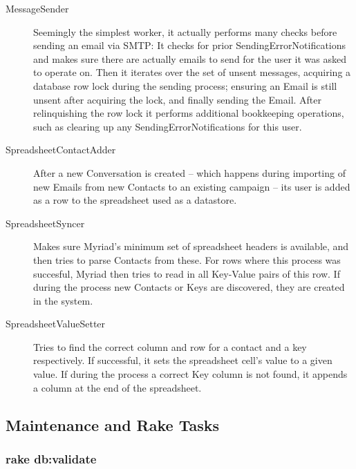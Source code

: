 \begin{description}
\item[MessageSender] Seemingly the simplest worker, it actually performs many checks before sending an email via SMTP: It checks for prior SendingErrorNotifications and makes sure there are actually emails to send for the user it was asked to operate on. Then it iterates over the set of unsent messages, acquiring a database row lock during the sending process; ensuring an Email is still unsent after acquiring the lock, and finally sending the Email. After relinquishing the row lock it performs additional bookkeeping operations, such as clearing up any SendingErrorNotifications for this user.

\item[SpreadsheetContactAdder] After a new Conversation is created -- which happens during importing of new Emails from new Contacts to an existing campaign -- its user is added as a row to the spreadsheet used as a datastore.

\item[SpreadsheetSyncer] Makes sure Myriad's minimum set of spreadsheet headers is available, and then tries to parse Contacts from these. For rows where this process was succesful, Myriad then tries to read in all Key-Value pairs of this row. If during the process new Contacts or Keys are discovered, they are created in the system.

\item[SpreadsheetValueSetter] Tries to find the correct column and row for a contact and a key respectively. If successful, it sets the spreadsheet cell's value to a given value. If during the process a correct Key column is not found, it appends a column at the end of the spreadsheet.

\end{description}

\subsection{Maintenance and Rake Tasks}

\subsubsection{rake db:validate}

